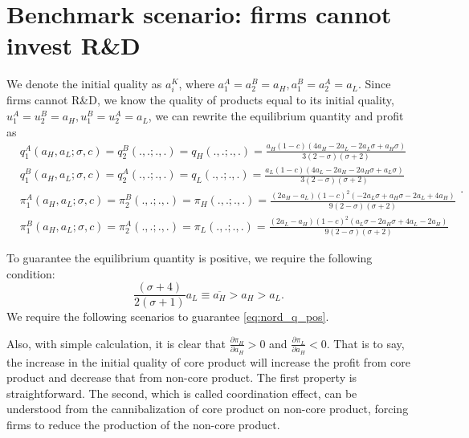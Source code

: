 \documentclass[12pt]{article}
\begin{document}
\section{Benchmark scenario: firms cannot invest R\&D} \label{sec:benchmark}
We denote the initial quality as $a_i^K$, where $a_1^A=a_2^B=a_H, a_1^B=a_2^A=a_L$.
Since firms cannot R\&D, we know the quality of products equal to its initial quality, $u_1^A=u_2^B=a_H,u_1^B=u_2^A=a_L$, we can rewrite the equilibrium quantity and profit as
\begin{equation}
    \begin{aligned}
        &q_1^A (a_H, a_L ; \sigma, c) = q_2^B (.,.; .,.) = q_H (.,.; .,.) = \frac{a_H  (1 - c)  (4 a_H - 2 a_L - 2 a_L \sigma + a_H \sigma)}{3 (2 - \sigma)  (\sigma + 2)}\\
        &q_1^B (a_H, a_L ; \sigma, c) = q_2^A (.,.;.,.) = q_L (.,.; .,.) = \frac{a_L  (1 - c)  (4 a_L - 2 a_H - 2 a_H \sigma + a_L \sigma)}{3 (2 - \sigma)  (\sigma + 2)}\\
        &\pi_1^A (a_H, a_L ; \sigma, c) = \pi_2^B (.,.; .,.) = \pi_H (.,.; .,.) = \frac{(2 a_H - a_L)  (1 - c)^2  (- 2 a_L \sigma + a_H \sigma - 2 a_L + 4 a_H)}{9 (2 - \sigma)  (\sigma + 2)}\\
        &\pi_1^B (a_H, a_L ; \sigma, c) = \pi_2^A (.,.; .,.) = \pi_L (.,.; .,.) = \frac{(2 a_L - a_H)  (1 - c)^2  (a_L \sigma - 2 a_H \sigma + 4 a_L - 2 a_H)}{9 (2 - \sigma)  (\sigma + 2)}
    \end{aligned}.
\end{equation}

To guarantee the equilibrium quantity is positive, we require the following condition:
\begin{equation}
  \frac{(\sigma + 4)}{2 (\sigma + 1)} a_L \equiv \overline{a_H} > a_H > a_L.
    \tag{C1}
    \label{eq:nord_q_pos}
\end{equation}
We require the following scenarios to guarantee \eqref{eq:nord_q_pos}.

Also, with simple calculation, it is clear that $\frac{\partial \pi_H}{\partial a_H}>0$ and $\frac{\partial \pi_L}{\partial a_H}<0$.
That is to say, the increase in the initial quality of core product will increase the profit from core product and decrease that from non-core product.
The first property is straightforward.
The second, which is called coordination effect, can be understood from the cannibalization of core product on non-core product, forcing firms to reduce the production of the non-core product.
\end{document}
